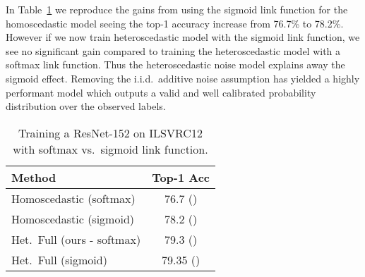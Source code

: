 \documentclass[final]{cvpr}
\begin{document}
In Table~\ref{table:sigmoid_ilsvrc12} we reproduce the gains from using the sigmoid link function for the homoscedastic model seeing the top-1 accuracy increase from 76.7\% to 78.2\%. However if we now train heteroscedastic model with the sigmoid link function, we see no significant gain compared to training the heteroscedastic model with a softmax link function. Thus the heteroscedastic noise model explains away the sigmoid effect. Removing the i.i.d.\ additive noise assumption has yielded a highly performant model which outputs a valid and well calibrated probability distribution over the observed labels.

\begin{table}[tbh]
\centering
\begin{tabular}{lc}
\toprule
Method & Top-1 Acc \\
\midrule
Homoscedastic (softmax) & 76.7 () \\
Homoscedastic (sigmoid) & 78.2 () \\
Het.\ Full (ours - softmax) & 79.3  () \\ 
Het.\ Full (sigmoid) & 79.35 () \\ 
\bottomrule
\end{tabular}
\caption{Training a ResNet-152 on ILSVRC12 with softmax vs.\ sigmoid link function.} 
\label{table:sigmoid_ilsvrc12}
\end{table}
\end{document}

